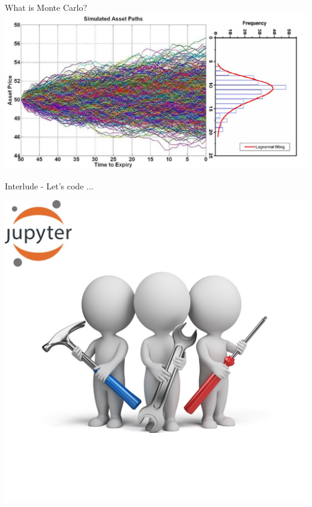 \documentclass[11pt]{beamer}
\begin{document}
\begin{frame}{What is Monte Carlo?}
\includegraphics[scale = 0.4]{img/MonteCarloPathsMany.jpg}
\end{frame}
\begin{frame}{Interlude - Let's code ...}
\begin{center}
\includegraphics[scale=.8]{img/exercise.jpg} 
\end{center}
\end{frame}
\end{document}
